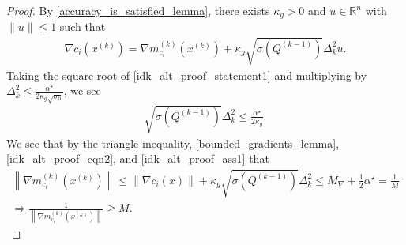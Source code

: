 \documentclass{article}
\theoremstyle{case}
\numberwithin{theorem}{subsection}
\newcommand{\dk}{\Delta_k}
\newcommand{\gmcik}{{\nabla m_{c_i}^{(k)}\left(\xk\right)}}
\newcommand{\maxgrad}{{M_{\nabla}}}
\newcommand{\minanglealpha}{{ \alpha^{\star} }}
\newcommand{\Rn}{\mathbb R^n}
\newcommand{\xk}{x^{(k)}}
\begin{document}
\begin{proof}
By \cref{accuracy_is_satisfied_lemma}, there exists $\kappa_{g} > 0$ and $u\in\Rn$ with $\|u\|\le 1$ such that
\begin{align}
\nabla c_i\left(\xk\right) = \gmcik + \kappa_g \sqrt{\sigma\left( Q^{(k-1)} \right)}\dk^2 u. \label{idk_alt_proof_eqn2}
\end{align}
Taking the square root of \cref{idk_alt_proof_statement1} and multiplying by $\dk^2 \le \frac {\minanglealpha}{2\kappa_g\sqrt{\sigma_0}}$, we see
\begin{align}
\sqrt{\sigma\left( Q^{(k-1)} \right)} \dk^2 \le \frac {\minanglealpha} {2\kappa_g}. \label{idk_alt_proof_ass1}
\end{align}
We see that by the triangle inequality, \cref{bounded_gradients_lemma}, \cref{idk_alt_proof_eqn2}, and \cref{idk_alt_proof_ass1} that
\begin{align}
\left\|\gmcik\right\| \le \left\| \nabla c_i\left(x\right)\right\| + \kappa_g \sqrt{\sigma\left( Q^{(k-1)} \right)} \dk^2 \le \maxgrad + \frac 1 2 \minanglealpha = \frac 1 M \nonumber \\
\Longrightarrow \frac 1 {\left\|\gmcik\right\|} \ge M. \label{idk_alt_proof_eqn4}
\end{align}


\end{proof}
\end{document}
